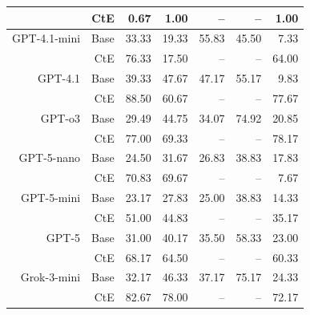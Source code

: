 \begin{table}[!t]
\begin{tabular}{r r !{\color{white!80!black} \vline} r r r r r}
 & CtE & 0.67 & 1.00 & -- & -- & 1.00 \\
\midrule
\sf GPT-4.1-mini & Base & 33.33 & 19.33 & 55.83 & 45.50 & 7.33 \\
 & CtE & 76.33 & 17.50 & -- & -- & 64.00 \\
\midrule
\sf GPT-4.1 & Base & 39.33 & 47.67 & 47.17 & 55.17 & 9.83 \\
 & CtE & 88.50 & 60.67 & -- & -- & 77.67 \\
\midrule
\sf GPT-o3 & Base & 29.49 & 44.75 & 34.07 & 74.92 & 20.85 \\
 & CtE & 77.00 & 69.33 & -- & -- & 78.17 \\
\midrule
\sf GPT-5-nano & Base & 24.50 & 31.67 & 26.83 & 38.83 & 17.83 \\
 & CtE & 70.83 & 69.67 & -- & -- & 7.67 \\
\midrule
\sf GPT-5-mini & Base & 23.17 & 27.83 & 25.00 & 38.83 & 14.33 \\
 & CtE & 51.00 & 44.83 & -- & -- & 35.17 \\
\midrule
\sf GPT-5 & Base & 31.00 & 40.17 & 35.50 & 58.33 & 23.00 \\
 & CtE & 68.17 & 64.50 & -- & -- & 60.33 \\
\midrule
\sf Grok-3-mini & Base & 32.17 & 46.33 & 37.17 & 75.17 & 24.33 \\
 & CtE & 82.67 & 78.00 & -- & -- & 72.17 \\
\bottomrule
\end{tabular}
\label{tab:cRi_by_id_act}
\end{table}